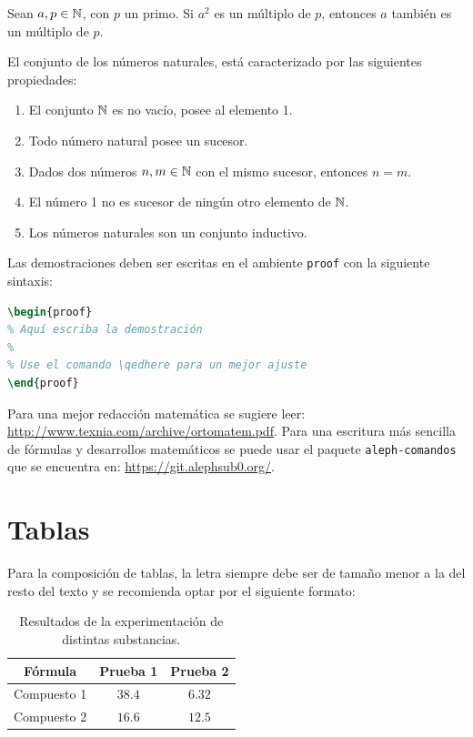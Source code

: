 \documentclass{aleph-revista}
\begin{document}
\begin{lem}
    Sean $a,p\in\mathbb{N}$, con $p$ un primo. Si $a^2$ es un múltiplo de $p$, entonces $a$ también es un múltiplo de $p$.
\end{lem}

\begin{axioma}
    El conjunto de los números naturales, está caracterizado por las siguientes propiedades:
    \begin{enumerate}
    \item
        El conjunto $\mathbb{N}$ es no vacío, posee al elemento 1.
    \item
        Todo número natural posee un sucesor.
    \item
        Dados dos números $n,m\in\mathbb{N}$ con el mismo sucesor, entonces $n=m$.
    \item
        El número 1 no es sucesor de ningún otro elemento de $\mathbb{N}$.
    \item
        Los números naturales son un conjunto inductivo.
    \end{enumerate}
\end{axioma}

Las demostraciones deben ser escritas en el ambiente \texttt{proof} con la siguiente sintaxis:

\begin{lstlisting}[language=TeX]
\begin{proof}
% Aquí escriba la demostración
%
% Use el comando \qedhere para un mejor ajuste
\end{proof}
\end{lstlisting}

Para una mejor redacción matemática se sugiere leer: \url{http://www.texnia.com/archive/ortomatem.pdf}. Para una escritura más sencilla de fórmulas y desarrollos matemáticos se puede usar el paquete \texttt{aleph-comandos} que se encuentra en: \url{https://git.alephsub0.org/}. 

\section{Tablas}

Para la composición de tablas, la letra siempre debe ser de tamaño menor a la del resto del texto y se recomienda optar por el siguiente formato:

\begin{table}[H]
    \centering\small
    \begin{tabular}{ccc}
    \toprule
        \textbf{Fórmula} & \textbf{Prueba 1} & \textbf{Prueba 2} \\ 
    \midrule
        Compuesto 1 & $38.4$  &  $6.32$\\ 
        Compuesto 2 & $16.6$ & $12.5$ \\ 
    \bottomrule
    \end{tabular}
    \label{tab:01}
    \caption{Resultados de la experimentación de distintas substancias.}
\end{table}
\end{document}
